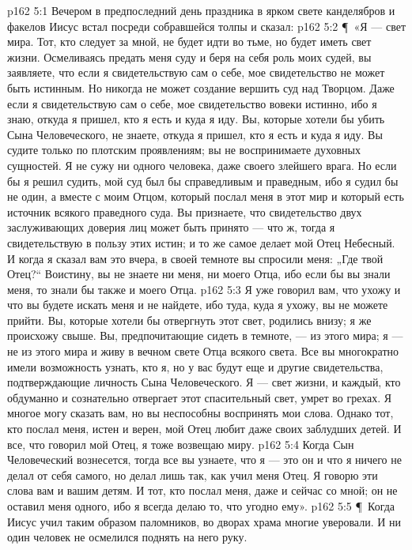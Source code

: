 \vs p162 5:1 Вечером в предпоследний день праздника в ярком свете канделябров и факелов Иисус встал посреди собравшейся толпы и сказал:
\vs p162 5:2 \P\ «Я --- свет мира. Тот, кто следует за мной, не будет идти во тьме, но будет иметь свет жизни. Осмеливаясь предать меня суду и беря на себя роль моих судей, вы заявляете, что если я свидетельствую сам о себе, мое свидетельство не может быть истинным. Но никогда не может создание вершить суд над Творцом. Даже если я свидетельствую сам о себе, мое свидетельство вовеки истинно, ибо я знаю, откуда я пришел, кто я есть и куда я иду. Вы, которые хотели бы убить Сына Человеческого, не знаете, откуда я пришел, кто я есть и куда я иду. Вы судите только по плотским проявлениям; вы не воспринимаете духовных сущностей. Я не сужу ни одного человека, даже своего злейшего врага. Но если бы я решил судить, мой суд был бы справедливым и праведным, ибо я судил бы не один, а вместе с моим Отцом, который послал меня в этот мир и который есть источник всякого праведного суда. Вы признаете, что свидетельство двух заслуживающих доверия лиц может быть принято --- что ж, тогда я свидетельствую в пользу этих истин; и то же самое делает мой Отец Небесный. И когда я сказал вам это вчера, в своей темноте вы спросили меня: „Где твой Отец?“ Воистину, вы не знаете ни меня, ни моего Отца, ибо если бы вы знали меня, то знали бы также и моего Отца.
\vs p162 5:3 Я уже говорил вам, что ухожу и что вы будете искать меня и не найдете, ибо туда, куда я ухожу, вы не можете прийти. Вы, которые хотели бы отвергнуть этот свет, родились внизу; я же происхожу свыше. Вы, предпочитающие сидеть в темноте, --- из этого мира; я --- не из этого мира и живу в вечном свете Отца всякого света. Все вы многократно имели возможность узнать, кто я, но у вас будут еще и другие свидетельства, подтверждающие личность Сына Человеческого. Я --- свет жизни, и каждый, кто обдуманно и сознательно отвергает этот спасительный свет, умрет во грехах. Я многое могу сказать вам, но вы неспособны воспринять мои слова. Однако тот, кто послал меня, истен и верен, мой Отец любит даже своих заблудших детей. И все, что говорил мой Отец, я тоже возвещаю миру.
\vs p162 5:4 Когда Сын Человеческий вознесется, тогда все вы узнаете, что я --- это он и что я ничего не делал от себя самого, но делал лишь так, как учил меня Отец. Я говорю эти слова вам и вашим детям. И тот, кто послал меня, даже и сейчас со мной; он не оставил меня одного, ибо я всегда делаю то, что угодно ему».
\vs p162 5:5 \P\ Когда Иисус учил таким образом паломников, во дворах храма многие уверовали. И ни один человек не осмелился поднять на него руку.
